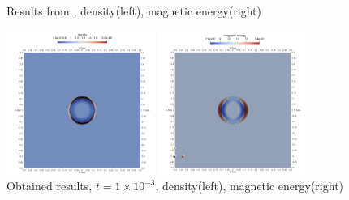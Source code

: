 \begin{figure}[H]
\centering
\hspace{-8mm}
\caption{Results from \cite{blast1}, density(left), magnetic energy(right)}
\label{figure:blastOldRef}
\end{figure}

\vspace{-5mm}
\begin{figure}[H]
	\begin{center}
		\includegraphics[width=0.87\textwidth]{img//mhd-blast/old/mynew1.jpg}
	\caption{Obtained results, $t = 1\times 10^{-3}$, density(left), magnetic energy(right)}
	\label{figure:blastOldMy1}
	\end{center}
\end{figure}
\vspace{-8mm}

